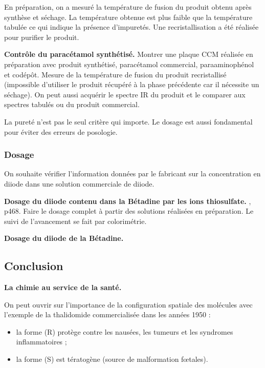En préparation, on a mesuré la température de fusion du produit obtenu après synthèse et séchage.
La température obtenue est plus faible que la température tabulée ce qui indique la présence d'impuretés.
Une recristallisation a été réalisée pour purifier le produit.

\begin{experience}
\textbf{Contrôle du paracétamol synthétisé.}
Montrer une plaque CCM réalisée en préparation avec produit synthétisé, paracétamol commercial, paraaminophénol et codépôt.
Mesure de la température de fusion du produit recristallisé (impossible d'utiliser le produit récupéré à la phase précédente car il nécessite un séchage).
On peut aussi acquérir le spectre IR du produit et le comparer aux spectres tabulés ou du produit commercial.
\end{experience}

\begin{transition}
La pureté n'est pas le seul critère qui importe.
Le dosage est aussi fondamental pour éviter des erreurs de posologie.
\end{transition}

\subsubsection{Dosage}

On souhaite vérifier l'information données par le fabricant sur la concentration en diiode dans une solution commerciale de diiode.

\begin{experience}
\textbf{Dosage du diiode contenu dans la Bétadine par les ions thiosulfate.}
\cite{Dulaurans2012}, p468.
Faire le dosage complet à partir des solutions réalisées en préparation.
Le suivi de l'avancement se fait par colorimétrie.
\end{experience}

\begin{slide}
\textbf{Dosage du diiode de la Bétadine.}
\end{slide}


\subsection*{Conclusion}

\begin{slide}
\textbf{La chimie au service de la santé.}
\end{slide}

On peut ouvrir sur l'importance de la configuration spatiale des molécules avec l'exemple de la thalidomide commercialisée dans les années 1950 :
\begin{itemize}
\item la forme (R) protège contre les nausées, les tumeurs et les syndromes inflammatoires ;
\item la forme (S) est tératogène (source de malformation fœtales).
\end{itemize}

\newpage